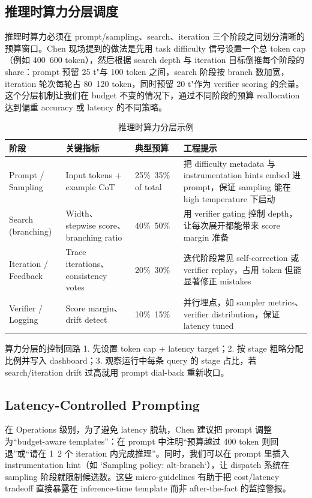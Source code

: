 \subsection{推理时算力分层调度}
推理时算力必须在 prompt/sampling、search、iteration 三个阶段之间划分清晰的预算窗口。Chen 现场提到的做法是先用 task difficulty 信号设置一个总 token cap（例如 400~600 token），然后根据 search depth 与 iteration 目标倒推每个阶段的 share：prompt 预留 25	t"与 100 token 之间，search 阶段按 branch 数加宽，iteration 轮次每轮占 80~120 token，同时预留 20	t"作为 verifier scoring 的余量。这个分层机制让我们在 budget 不变的情况下，通过不同阶段的预算 reallocation 达到偏重 accuracy 或 latency 的不同策略。

\begin{table}[H]
\centering
\caption{推理时算力分层示例}
\begin{tabular}{p{}p{}p{}p{}}
\toprule
阶段 & 关键指标 & 典型预算 & 工程提示 \\
\midrule
Prompt / Sampling & Input tokens + example CoT & 25\%~35\% of total & 把 difficulty metadata 与 instrumentation hints embed 进 prompt，保证 sampling 能在 high temperature 下启动 \\
Search (branching) & Width、stepwise score、branching ratio & 40\%~50\% & 用 verifier gating 控制 depth，让每次展开都能带来 score margin 准备 \\
Iteration / Feedback & Trace iterations、consistency votes & 20\%~30\% & 迭代阶段常见 self-correction 或 verifier replay，占用 token 但能显著修正 mistakes \\
Verifier / Logging & Score margin、drift detect & 10\%~15\% & 并行埋点，如 sampler metrics、verifier distribution，保证 latency tuned \\
\bottomrule
\end{tabular}
\end{table}

\begin{knowledgebox}{算力分层的控制回路}
1. 先设置 token cap + latency target；2. 按 stage 粗略分配比例并写入 dashboard；3. 观察运行中每条 query 的 stage 占比，若 search/iteration drift 过高就用 prompt dial-back 重新收口。
\end{knowledgebox}

\subsection{Latency-Controlled Prompting}
在 Operations 级别，为了避免 latency 脱轨，Chen 建议把 prompt 调整为“budget-aware templates”：在 prompt 中注明“预算越过 400 token 则回退”或“请在 1~2 个 iteration 内完成推理”。同时，我们可以在 prompt 里插入 instrumentation hint（如 `Sampling policy: alt-branch`），让 dispatch 系统在 sampling 阶段就限制候选数。这些 micro-guidelines 有助于把 cost/latency tradeoff 直接暴露在 inference-time template 而非 after-the-fact 的监控警报。

